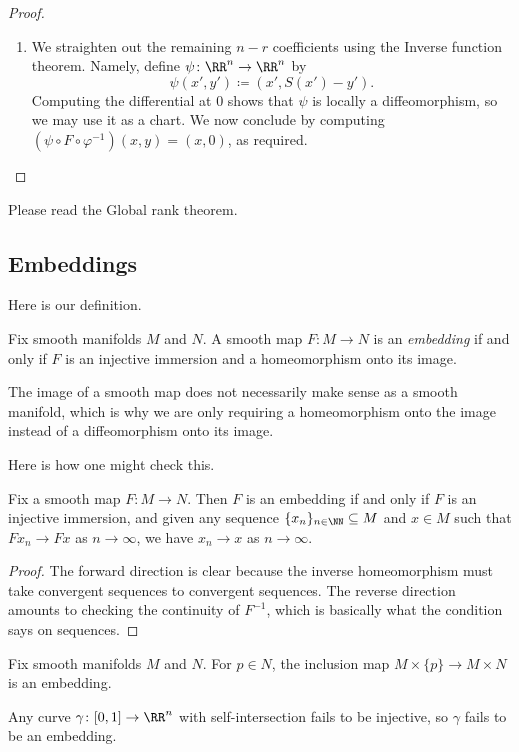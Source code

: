 \documentclass[../notes.tex]{subfiles}
\begin{document}
\begin{proof}
\begin{enumerate}
		\item We straighten out the remaining $n-r$ coefficients using the Inverse function theorem. Namely, define $\psi\colon\RR^n\to\RR^n$ by
		\[\psi(x',y')\coloneqq(x',S(x')-y').\]
		Computing the differential at $0$ shows that $\psi$ is locally a diffeomorphism, so we may use it as a chart. We now conclude by computing $\left(\psi\circ F\circ\varphi^{-1}\right)(x,y)=(x,0)$, as required.
		\qedhere
	\end{enumerate}
\end{proof}
\begin{remark}
	Please read the Global rank theorem.
\end{remark}

\subsection{Embeddings}
Here is our definition.
\begin{definition}
	Fix smooth manifolds $M$ and $N$. A smooth map $F\colon M\to N$ is an \textit{embedding} if and only if $F$ is an injective immersion and a homeomorphism onto its image.
\end{definition}
\begin{remark}
	The image of a smooth map does not necessarily make sense as a smooth manifold, which is why we are only requiring a homeomorphism onto the image instead of a diffeomorphism onto its image.
\end{remark}
Here is how one might check this.
\begin{lemma} \label{lem:how-to-embed}
	Fix a smooth map $F\colon M\to N$. Then $F$ is an embedding if and only if $F$ is an injective immersion, and given any sequence $\{x_n\}_{n\in\NN}\subseteq M$ and $x\in M$ such that $Fx_n\to Fx$ as $n\to\infty$, we have $x_n\to x$ as $n\to\infty$.
\end{lemma}
\begin{proof}
	The forward direction is clear because the inverse homeomorphism must take convergent sequences to convergent sequences. The reverse direction amounts to checking the continuity of $F^{-1}$, which is basically what the condition says on sequences.
\end{proof}
\begin{example}
	Fix smooth manifolds $M$ and $N$. For $p\in N$, the inclusion map $M\times\{p\}\to M\times N$ is an embedding.
\end{example}
\begin{nex}
	Any curve $\gamma\colon[0,1]\to\RR^n$ with self-intersection fails to be injective, so $\gamma$ fails to be an embedding.
\end{nex}
\end{document}
